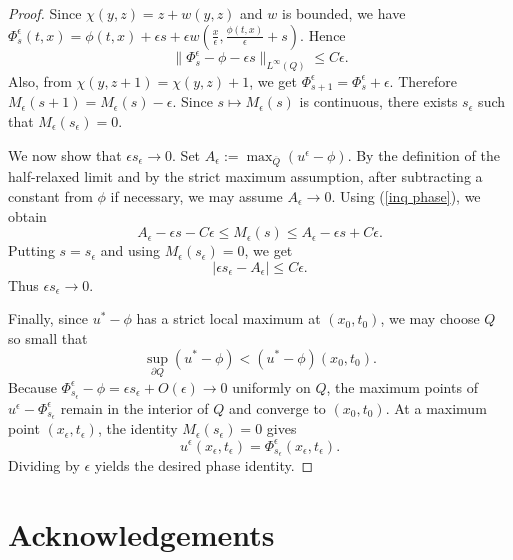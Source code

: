 \documentclass[preprint]{elsarticle}
\numberwithin{equation}{section}
\begin{document}
\begin{proof}
Since $\chi(y,z)=z+w(y,z)$ and $w$ is bounded, we have $\Phi_s^\epsilon(t,x)
=
\phi(t,x)+\epsilon s
+
\epsilon w\left(
\frac{x}{\epsilon},
\frac{\phi(t,x)}{\epsilon}+s
\right).$
Hence
\begin{equation}
\|\Phi_s^\epsilon-\phi-\epsilon s\|_{L^\infty(Q)}
\le C\epsilon.\label{inq phase}
\end{equation}
Also, from $\chi(y,z+1)=\chi(y,z)+1$, we get $\Phi_{s+1}^\epsilon=\Phi_s^\epsilon+\epsilon.$
Therefore $M_\epsilon(s+1)=M_\epsilon(s)-\epsilon.$
Since $s\mapsto M_\epsilon(s)$ is continuous, there exists $s_\epsilon$ such that $M_\epsilon(s_\epsilon)=0.$

We now show that $\epsilon s_\epsilon\to0$. Set
$
A_\epsilon:=\max_{\overline Q}(u^\epsilon-\phi).
$
By the definition of the half-relaxed limit and by the strict maximum assumption, after subtracting a constant from $\phi$ if necessary, we may assume
$
A_\epsilon\to0.
$
Using (\ref{inq phase}),
we obtain
\begin{equation*}
A_\epsilon-\epsilon s-C\epsilon
\le
M_\epsilon(s)
\le
A_\epsilon-\epsilon s+C\epsilon.
\end{equation*}
Putting $s=s_\epsilon$ and using $M_\epsilon(s_\epsilon)=0$, we get
\begin{equation*}
|\epsilon s_\epsilon-A_\epsilon|\le C\epsilon.
\end{equation*}
Thus $\epsilon s_\epsilon\to0.$

Finally, since $u^*-\phi$ has a strict local maximum at $(x_0,t_0)$, we may choose $Q$ so small that
\begin{equation*}
\sup_{\partial Q}(u^*-\phi)
<
(u^*-\phi)(x_0,t_0).
\end{equation*}
Because $\Phi_{s_\epsilon}^\epsilon-\phi=\epsilon s_\epsilon+O(\epsilon)\to0$ uniformly on $Q$, the maximum points of
$
u^\epsilon-\Phi_{s_\epsilon}^\epsilon
$
remain in the interior of $Q$ and converge to $(x_0,t_0)$. At a maximum point $(x_\epsilon,t_\epsilon)$, the identity
$
M_\epsilon(s_\epsilon)=0
$
gives
\begin{equation*}
u^\epsilon(x_\epsilon,t_\epsilon)
=
\Phi_{s_\epsilon}^\epsilon(x_\epsilon,t_\epsilon).
\end{equation*}
Dividing by $\epsilon$ yields the desired phase identity.
\end{proof}


\section*{Acknowledgements}
\end{document}
